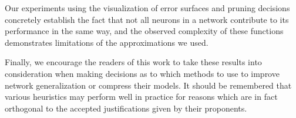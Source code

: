 Our experiments using the visualization of error surfaces and pruning decisions concretely establish the fact that not all neurons in a network contribute to its performance in the same way, and the observed complexity of these functions demonstrates limitations of the approximations we used. 

Finally, we encourage the readers of this work to take these results into consideration when making decisions as to which methods to use to improve network generalization or compress their models. It should be remembered that various heuristics may perform well in practice for reasons which are in fact orthogonal to the accepted justifications given by their proponents. 

